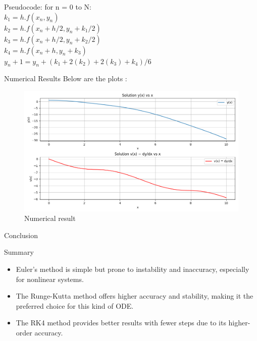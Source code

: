 \documentclass{beamer}
\begin{document}
\begin{frame}[t]{Pseudocode:}
for n = 0 to N: \\
    $k_1 = h . f(x_n, y_n)$ \\
    $k_2 = h  .f(x_n + h/2, y_n + k_1/2)$ \\
    $k_3 = h . f(x_n + h/2, y_n + k_2/2)$ \\
    $k_4 = h . f(x_n + h, y_n + k_3)$ \\ 
    $y_n+1 = y_n + (k_1 + 2(k_2) + 2(k_3) + k_4)/6 $ \\
\end{frame}

\begin{frame}{Numerical Results}
Below are the plots :
\begin{figure}[h]
    \centering
    \includegraphics[width=\columnwidth]{fig/Figure_1.png}  
    \caption{Numerical result}
    \label{fig:results}
\end{figure}
\end{frame}

\begin{frame}{Conclusion}
\begin{block}{Summary}
\begin{itemize}
    \item Euler’s method is simple but prone to instability and inaccuracy, especially for nonlinear systems.
    \item The Runge-Kutta method offers higher accuracy and stability, making it the preferred choice for this kind of ODE.
    \item The RK4 method provides better results with fewer steps due to its higher-order accuracy.
\end{itemize}
\end{block}
\end{frame}
\end{document}
